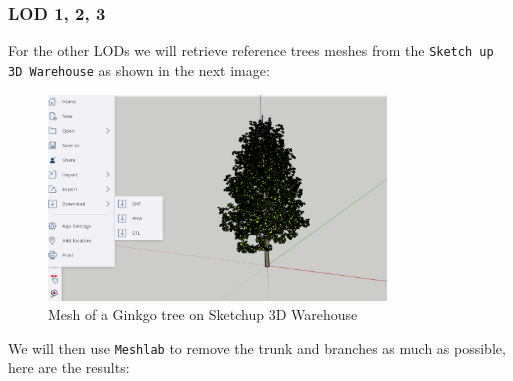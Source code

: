 \documentclass[12pt]{article}
\begin{document}
\subsubsection{LOD 1, 2, 3}
For the other LODs we will retrieve reference trees meshes from the
\texttt{Sketch up 3D Warehouse}\cite{sketchup} as shown in the next image:
\begin{figure}[H]
    \centering
        \centering
        \includegraphics[width=0.8\textwidth]{images/ginkgo-sketchup.png}
        \caption{Mesh of a Ginkgo tree on Sketchup 3D Warehouse}
\end{figure}

We will then use \texttt{Meshlab}\cite{meshlab} to remove the trunk and branches as
much as possible, here are the results:
\end{document}
